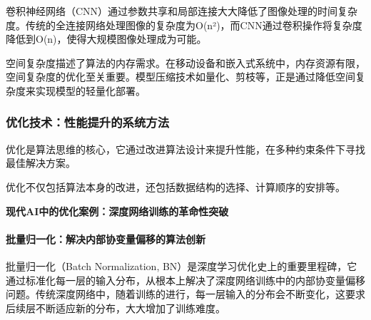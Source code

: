 卷积神经网络（CNN）通过参数共享和局部连接大大降低了图像处理的时间复杂度。传统的全连接网络处理图像的复杂度为O(n²)，而CNN通过卷积操作将复杂度降低到O(n)，使得大规模图像处理成为可能。

空间复杂度描述了算法的内存需求。在移动设备和嵌入式系统中，内存资源有限，空间复杂度的优化至关重要。模型压缩技术如量化、剪枝等，正是通过降低空间复杂度来实现模型的轻量化部署。

  
\subsubsection{优化技术：性能提升的系统方法}
优化是算法思维的核心，它通过改进算法设计来提升性能，在多种约束条件下寻找最佳解决方案。

优化不仅包括算法本身的改进，还包括数据结构的选择、计算顺序的安排等。

%  
%  
%

\textbf{现代AI中的优化案例：深度网络训练的革命性突破}

\paragraph{批量归一化：解决内部协变量偏移的算法创新}
批量归一化（Batch Normalization, BN）是深度学习优化史上的重要里程碑，它通过标准化每一层的输入分布，从根本上解决了深度网络训练中的内部协变量偏移问题。传统深度网络中，随着训练的进行，每一层输入的分布会不断变化，这要求后续层不断适应新的分布，大大增加了训练难度。

